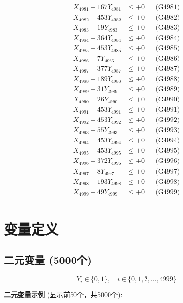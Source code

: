 \documentclass[a4paper,10pt]{article}
\begin{document}
{\begin{align}
\allowbreak
X_{4981} - 167Y_{4981} &\leq +0 && \text{(G4981)} \\
X_{4982} - 453Y_{4982} &\leq +0 && \text{(G4982)} \\
X_{4983} - 19Y_{4983} &\leq +0 && \text{(G4983)} \\
X_{4984} - 364Y_{4984} &\leq +0 && \text{(G4984)} \\
X_{4985} - 453Y_{4985} &\leq +0 && \text{(G4985)} \\
X_{4986} - 7Y_{4986} &\leq +0 && \text{(G4986)} \\
X_{4987} - 377Y_{4987} &\leq +0 && \text{(G4987)} \\
X_{4988} - 189Y_{4988} &\leq +0 && \text{(G4988)} \\
X_{4989} - 31Y_{4989} &\leq +0 && \text{(G4989)} \\
X_{4990} - 26Y_{4990} &\leq +0 && \text{(G4990)} \\
\allowbreak
X_{4991} - 453Y_{4991} &\leq +0 && \text{(G4991)} \\
X_{4992} - 453Y_{4992} &\leq +0 && \text{(G4992)} \\
X_{4993} - 55Y_{4993} &\leq +0 && \text{(G4993)} \\
X_{4994} - 453Y_{4994} &\leq +0 && \text{(G4994)} \\
X_{4995} - 453Y_{4995} &\leq +0 && \text{(G4995)} \\
X_{4996} - 372Y_{4996} &\leq +0 && \text{(G4996)} \\
X_{4997} - 8Y_{4997} &\leq +0 && \text{(G4997)} \\
X_{4998} - 193Y_{4998} &\leq +0 && \text{(G4998)} \\
X_{4999} - 49Y_{4999} &\leq +0 && \text{(G4999)} \\
\end{align}
}

\section{变量定义}

\subsection{二元变量 (5000个)}

\begin{equation}
Y_i \in \{0,1\}, \quad i \in \{0, 1, 2, \ldots, 4999\}
\end{equation}

\textbf{二元变量示例} (显示前50个，共5000个):
\end{document}
